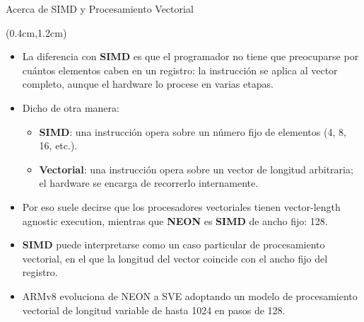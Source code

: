 \begin{frame}{Acerca de SIMD y Procesamiento Vectorial}
 \begin{textblock*}{\textwidth}(0.4cm,1.2cm)
  \begin{tcolorbox}[enhanced jigsaw,rounded corners, drop fuzzy shadow=ShadowColor]
   \begin{itemize}[<+->]\justifying
    \item La diferencia con \textbf{SIMD} es que el programador no tiene que preocuparse por cuántos elementos caben en un registro: la instrucción se aplica al vector completo, aunque el hardware lo procese en varias etapas.
    \item Dicho de otra manera:
    \begin{itemize}[<+->]\justifying
     \item \textbf{SIMD}: una instrucción opera sobre un número fijo de elementos (4, 8, 16, etc.).
     \item \textbf{Vectorial}: una instrucción opera sobre un vector de longitud arbitraria; el hardware se encarga de recorrerlo internamente.
    \end{itemize}
    \item Por eso suele decirse que los procesadores vectoriales tienen vector-length agnostic execution, mientras que \textbf{NEON} es \textbf{SIMD} de ancho fijo: \SI{128}{\bit}.
    \item \textbf{SIMD} puede interpretarse como un caso particular de procesamiento vectorial, en el que la longitud del vector coincide con el ancho fijo del registro.
    \item ARMv8 evoluciona de NEON a SVE adoptando un modelo de procesamiento vectorial de longitud variable  de hasta \SI{1024}{\bit} en pasos de \SI{128}{\bit}.
   \end{itemize}
  \end{tcolorbox}
 \end{textblock*}
\end{frame}
